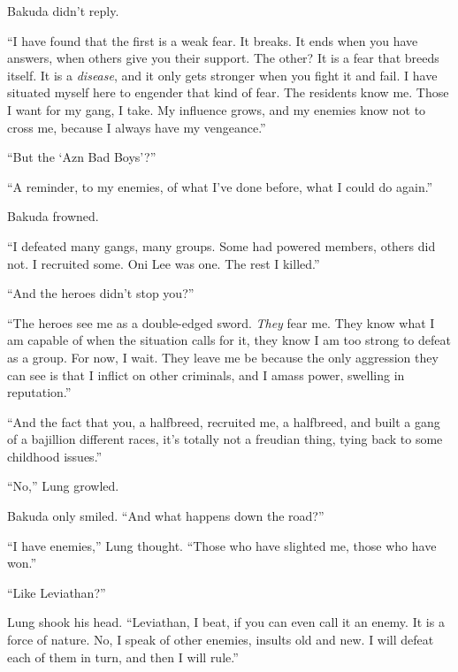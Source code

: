 Bakuda didn't reply.



``I have found that the first is a weak fear.  It breaks.  It ends when you have answers, when others give you their support.  The other?  It is a fear that breeds itself.  It is a \emph{disease}, and it only gets stronger when you fight it and fail.  I have situated myself here to engender that kind of fear.  The residents know me.  Those I want for my gang, I take.  My influence grows, and my enemies know not to cross me, because I always have my vengeance.''



``But the `Azn Bad Boys'?''



``A reminder, to my enemies, of what I've done before, what I could do again.''



Bakuda frowned.



``I defeated many gangs, many groups.  Some had powered members, others did not.  I recruited some.  Oni Lee was one.  The rest I killed.''



``And the heroes didn't stop you?''



``The heroes see me as a double-edged sword.  \emph{They }fear me.  They know what I am capable of when the situation calls for it, they know I am too strong to defeat as a group.  For now, I wait.  They leave me be because the only aggression they can see is that I inflict on other criminals, and I amass power, swelling in reputation.''



``And the fact that you, a halfbreed, recruited me, a halfbreed, and built a gang of a bajillion different races, it's totally not a freudian thing, tying back to some childhood issues.''



``No,'' Lung growled.



Bakuda only smiled.  ``And what happens down the road?''



``I have enemies,'' Lung thought.  ``Those who have slighted me, those who have won.''



``Like Leviathan?''



Lung shook his head.  ``Leviathan, I beat, if you can even call it an enemy.  It is a force of nature.  No, I speak of other enemies, insults old and new.  I will defeat each of them in turn, and then I will rule.''



